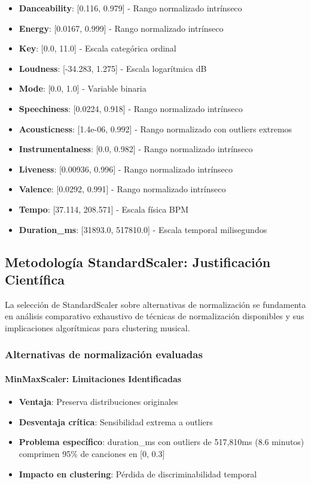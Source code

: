 \documentclass[12pt,a4paper]{article}
\begin{document}
\begin{itemize}
    \item \textbf{Danceability}: [0.116, 0.979] - Rango normalizado intrínseco
    \item \textbf{Energy}: [0.0167, 0.999] - Rango normalizado intrínseco
    \item \textbf{Key}: [0.0, 11.0] - Escala categórica ordinal
    \item \textbf{Loudness}: [-34.283, 1.275] - Escala logarítmica dB
    \item \textbf{Mode}: [0.0, 1.0] - Variable binaria
    \item \textbf{Speechiness}: [0.0224, 0.918] - Rango normalizado intrínseco
    \item \textbf{Acousticness}: [1.4e-06, 0.992] - Rango normalizado con outliers extremos
    \item \textbf{Instrumentalness}: [0.0, 0.982] - Rango normalizado intrínseco
    \item \textbf{Liveness}: [0.00936, 0.996] - Rango normalizado intrínseco
    \item \textbf{Valence}: [0.0292, 0.991] - Rango normalizado intrínseco
    \item \textbf{Tempo}: [37.114, 208.571] - Escala física BPM
    \item \textbf{Duration\_ms}: [31893.0, 517810.0] - Escala temporal milisegundos
\end{itemize}

\subsection{Metodología StandardScaler: Justificación Científica}

La selección de StandardScaler sobre alternativas de normalización se fundamenta en análisis comparativo exhaustivo de técnicas de normalización disponibles y sus implicaciones algorítmicas para clustering musical.

\subsubsection{Alternativas de normalización evaluadas}

\paragraph{MinMaxScaler: Limitaciones Identificadas}
\begin{itemize}
    \item \textbf{Ventaja}: Preserva distribuciones originales
    \item \textbf{Desventaja crítica}: Sensibilidad extrema a outliers
    \item \textbf{Problema específico}: duration\_ms con outliers de 517,810ms (8.6 minutos) comprimen 95\% de canciones en [0, 0.3]
    \item \textbf{Impacto en clustering}: Pérdida de discriminabilidad temporal
\end{itemize}
\end{document}

